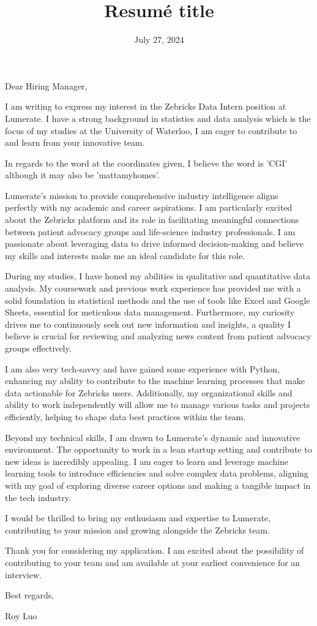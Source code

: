 \documentclass[11pt,a4paper,roman]{moderncv}        %
\title{Resumé title}                               %
\date{July 27, 2024}                              %
\begin{document}
\recipient{\phantom{1}}{}
\opening{\phantom{1}}
\closing{\phantom{1}}
\enclosure[\phantom{1}]{\phantom{1}}          %
\makelettertitle

Dear Hiring Manager,

I am writing to express my interest in the Zebricks Data Intern position at Lumerate. I have a strong background in statistics and data analysis which is the focus of my studies at the University of Waterloo, I am eager to contribute to and learn from your innovative team.

In regards to the word at the coordinates given, I believe the word is 'CGI' although it may also be 'mattamyhomes'.

Lumerate’s mission to provide comprehensive industry intelligence aligns perfectly with my academic and career aspirations. I am particularly excited about the Zebricks platform and its role in facilitating meaningful connections between patient advocacy groups and life-science industry professionals. I am passionate about leveraging data to drive informed decision-making and believe my skills and interests make me an ideal candidate for this role.

During my studies, I have honed my abilities in qualitative and quantitative data analysis. My coursework and previous work experience has provided me with a solid foundation in statistical methods and the use of tools like Excel and Google Sheets, essential for meticulous data management. Furthermore, my curiosity drives me to continuously seek out new information and insights, a quality I believe is crucial for reviewing and analyzing news content from patient advocacy groups effectively.

I am also very tech-savvy and have gained some experience with Python, enhancing my ability to contribute to the machine learning processes that make data actionable for Zebricks users. Additionally, my organizational skills and ability to work independently will allow me to manage various tasks and projects efficiently, helping to shape data best practices within the team.

Beyond my technical skills, I am drawn to Lumerate's dynamic and innovative environment. The opportunity to work in a lean startup setting and contribute to new ideas is incredibly appealing. I am eager to learn and leverage machine learning tools to introduce efficiencies and solve complex data problems, aligning with my goal of exploring diverse career options and making a tangible impact in the tech industry.

I would be thrilled to bring my enthusiasm and expertise to Lumerate, contributing to your mission and growing alongside the Zebricks team.

Thank you for considering my application. I am excited about the possibility of contributing to your team and am available at your earliest convenience for an interview.

Best regards,

Roy Luo

\vspace{0.5cm}
\end{document}
